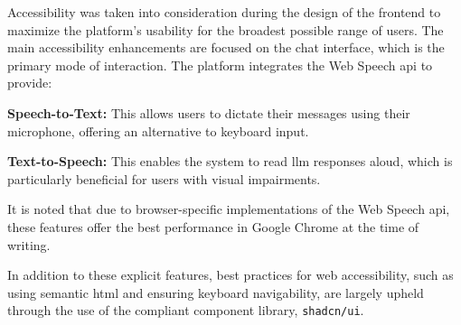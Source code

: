 Accessibility was taken into consideration during the design of the frontend to maximize the platform's usability for the broadest possible range of users. The main accessibility enhancements are focused on the chat interface, which is the primary mode of interaction. The platform integrates the Web Speech \acs{api} to provide:
\begin{compactitem}[\textbullet]
    \item \textbf{Speech-to-Text:} This allows users to dictate their messages using their microphone, offering an alternative to keyboard input.
    \item \textbf{Text-to-Speech:} This enables the system to read \ac{llm} responses aloud, which is particularly beneficial for users with visual impairments.
\end{compactitem}
It is noted that due to browser-specific implementations of the Web Speech \acs{api}, these features offer the best performance in Google Chrome at the time of writing.

In addition to these explicit features, best practices for web accessibility, such as using semantic \acs{html} and ensuring keyboard navigability, are largely upheld through the use of the compliant component library, \texttt{shadcn/ui}.
